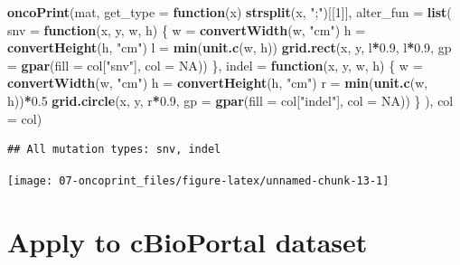 \documentclass[]{book}
\newenvironment{Shaded}{\begin{snugshade}}{\end{snugshade}}
\newcommand{\KeywordTok}[1]{\textcolor[rgb]{0.13,0.29,0.53}{\textbf{#1}}}
\newcommand{\DataTypeTok}[1]{\textcolor[rgb]{0.13,0.29,0.53}{#1}}
\newcommand{\DecValTok}[1]{\textcolor[rgb]{0.00,0.00,0.81}{#1}}
\newcommand{\FloatTok}[1]{\textcolor[rgb]{0.00,0.00,0.81}{#1}}
\newcommand{\StringTok}[1]{\textcolor[rgb]{0.31,0.60,0.02}{#1}}
\newcommand{\OtherTok}[1]{\textcolor[rgb]{0.56,0.35,0.01}{#1}}
\newcommand{\ControlFlowTok}[1]{\textcolor[rgb]{0.13,0.29,0.53}{\textbf{#1}}}
\newcommand{\OperatorTok}[1]{\textcolor[rgb]{0.81,0.36,0.00}{\textbf{#1}}}
\newcommand{\NormalTok}[1]{#1}
\theoremstyle{definition}
\theoremstyle{definition}
\theoremstyle{definition}
\theoremstyle{remark}
\begin{document}
\begin{Shaded}
\begin{Highlighting}[]
\KeywordTok{oncoPrint}\NormalTok{(mat, }\DataTypeTok{get_type =} \ControlFlowTok{function}\NormalTok{(x) }\KeywordTok{strsplit}\NormalTok{(x, }\StringTok{";"}\NormalTok{)[[}\DecValTok{1}\NormalTok{]],}
    \DataTypeTok{alter_fun =} \KeywordTok{list}\NormalTok{(}
        \DataTypeTok{snv =} \ControlFlowTok{function}\NormalTok{(x, y, w, h) \{}
\NormalTok{            w =}\StringTok{ }\KeywordTok{convertWidth}\NormalTok{(w, }\StringTok{"cm"}\NormalTok{)}
\NormalTok{            h =}\StringTok{ }\KeywordTok{convertHeight}\NormalTok{(h, }\StringTok{"cm"}\NormalTok{)}
\NormalTok{            l =}\StringTok{ }\KeywordTok{min}\NormalTok{(}\KeywordTok{unit.c}\NormalTok{(w, h))}
            \KeywordTok{grid.rect}\NormalTok{(x, y, l}\OperatorTok{*}\FloatTok{0.9}\NormalTok{, l}\OperatorTok{*}\FloatTok{0.9}\NormalTok{, }\DataTypeTok{gp =} \KeywordTok{gpar}\NormalTok{(}\DataTypeTok{fill =}\NormalTok{ col[}\StringTok{"snv"}\NormalTok{], }\DataTypeTok{col =} \OtherTok{NA}\NormalTok{))}
\NormalTok{        \},}
        \DataTypeTok{indel =} \ControlFlowTok{function}\NormalTok{(x, y, w, h) \{}
\NormalTok{            w =}\StringTok{ }\KeywordTok{convertWidth}\NormalTok{(w, }\StringTok{"cm"}\NormalTok{)}
\NormalTok{            h =}\StringTok{ }\KeywordTok{convertHeight}\NormalTok{(h, }\StringTok{"cm"}\NormalTok{)}
\NormalTok{            r =}\StringTok{ }\KeywordTok{min}\NormalTok{(}\KeywordTok{unit.c}\NormalTok{(w, h))}\OperatorTok{*}\FloatTok{0.5}
            \KeywordTok{grid.circle}\NormalTok{(x, y, r}\OperatorTok{*}\FloatTok{0.9}\NormalTok{, }\DataTypeTok{gp =} \KeywordTok{gpar}\NormalTok{(}\DataTypeTok{fill =}\NormalTok{ col[}\StringTok{"indel"}\NormalTok{], }\DataTypeTok{col =} \OtherTok{NA}\NormalTok{))}
\NormalTok{        \}}
\NormalTok{    ), }\DataTypeTok{col =}\NormalTok{ col)}
\end{Highlighting}
\end{Shaded}

\begin{verbatim}
## All mutation types: snv, indel
\end{verbatim}

\begin{center}\texttt{[image: 07-oncoprint\_files/figure-latex/unnamed-chunk-13-1]} \end{center}

\section{Apply to cBioPortal dataset}\label{apply-to-cbioportal-dataset}
\end{document}

